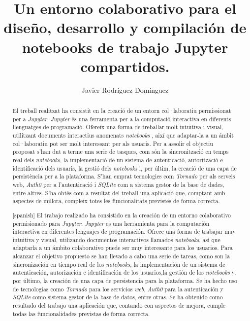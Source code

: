 \documentclass[11pt,spanish,listoffigures]{tfgetsinf}
\title{Un entorno colaborativo para el diseño, desarrollo y compilación de notebooks de trabajo Jupyter compartidos. }
\author{Javier Rodríguez Domínguez}
\begin{document}

\begin{abstract}
El treball realitzat ha consistit en la creació de un entorn col·laboratiu permissionat per a \textit{Jupyter}. \textit{Jupyter} és una ferramenta per a la computació interactiva en diferents llenguatges  de programació. Ofereix una forma de treballar molt intuïtiva i visual, utilitzant documents interactius anomenats \textit{notebooks} , així que adaptar-la a un ámbit col·laboratiu pot ser molt interessant per als usuaris. Per a assolir el objectiu proposat s'han dut a terme una serie de tasques, com són la sincronització en temps real dels \textit{notebooks}, la implementació de un sistema de autenticació, autorització e identificació dels usuaris, la gestió dels \textit{notebooks} i, per últim, la creació de una capa de persistència per a la plataforma. S'han emprat tecnologies com \textit{Tornado} per als serveis web, \textit{Auth0} per a l'autenticació i \textit{SQLite} com a sistema gestor de la base de dades, entre altres. S'ha obtés com a resultat del treball una aplicació que, comptant amb aspectes de millora, compleix totes les funcionalitats previstes de forma correcta.
\end{abstract}
\begin{abstract}[spanish]
El trabajo realizado ha consistido en la creación de un entorno colaborativo permisionado para \textit{Jupyter}. \textit{Jupyter} es una herramienta para la computación interactiva en diferentes lenguajes de programación. Ofrece una forma de trabajar muy intuitiva y visual, utilizando documentos interactivos llamados \textit{notebooks}, así que adaptarla a un ámbito colaborativo puede ser muy interesante para los usuarios. Para alcanzar el objetivo propuesto se han llevado a cabo una serie de tareas, como son la sincronización en tiempo real de los \textit{notebooks}, la implementación de un sistema de autenticación, autorización e identificación de los usuarios,la gestión de los \textit{notebooks} y, por último, la creación de una capa de persistencia para la plataforma. Se ha hecho uso de tecnologías como \textit{Tornado} para los servicios \textit{web}, \textit{Auth0} para la autenticación y \textit{SQLite} como sistema gestor de la base de datos, entre otras. Se ha obtenido como resultado del trabajo una aplicación que, contando con aspectos de mejora, cumple todas las funcionalidades previstas de forma correcta.
\end{abstract}
\end{document}
